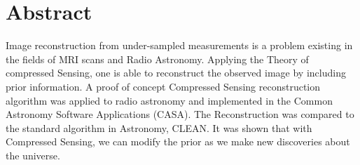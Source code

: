 \section*{Abstract}
Image reconstruction from under-sampled measurements is a problem existing in the fields of MRI scans and Radio Astronomy. Applying the Theory of compressed Sensing, one is able to reconstruct the observed image by including prior information. A proof of concept Compressed Sensing reconstruction algorithm was applied to radio astronomy and implemented in the Common Astronomy Software Applications (CASA). The Reconstruction was compared to the standard algorithm in Astronomy, CLEAN. It was shown that with Compressed Sensing, we can modify the prior as we make new discoveries about the universe.



